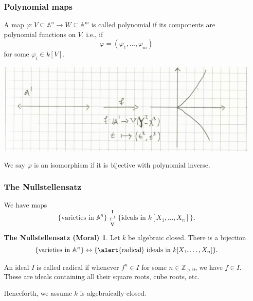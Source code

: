\documentclass{beamer}
\theoremstyle{definition}
\theoremstyle{definition}
\newtheorem{nullstellensatz}{The Nullstellensatz (Moral)}
\begin{document}
\begin{frame}
\frametitle{Polynomial maps}
A map $\varphi : V \subseteq \mathbb{A}^n \to W \subseteq \mathbb{A}^m$ is called \alert{polynomial} if its components are polynomial functions on $V$, i.e., if
$$\varphi = (\varphi_1, \ldots, \varphi_m)$$
for some $\varphi_i \in k[V]$.



\includegraphics[width=\textwidth]{polynomial_map}

We say $\varphi$ is an isomorphism if it is bijective with polynomial inverse.
\end{frame}

\begin{frame}
\frametitle{The Nullstellensatz}
We have maps
$$\{ \text{varieties in } \mathbb{A}^n \} \underset{\mathbf{V}}{\overset{\mathbf{I}}{\rightleftarrows}}  \{\text{ideals in } k[X_1, \ldots, X_n] \}.$$

\begin{nullstellensatz}
Let $k$ be \alert{algebraic closed}.
There is a bijection
$$\{ \text{varieties in } \mathbb{A}^n \} \leftrightarrow \{\text{\alert{radical} ideals in } k[X_1, \ldots, X_n] \}.$$
\end{nullstellensatz}

An ideal $I$ is called radical if whenever $f^n \in I$ for some $n \in \mathbb{Z}_{> 0}$, we have $f \in I$.
These are ideals containing all their square roots, cube roots, etc.

Henceforth, we assume $k$ is algebraically closed.
\end{frame}
\end{document}
